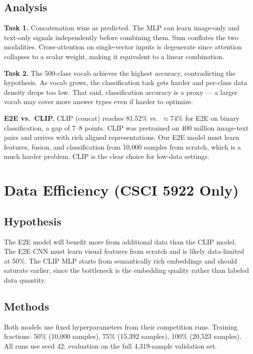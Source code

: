 \documentclass[11pt]{article}
\begin{document}
\subsection{Analysis}

\textbf{Task 1.} Concatenation wins as predicted. The MLP can learn image-only and
text-only signals independently before combining them. Sum conflates the two modalities.
Cross-attention on single-vector inputs is degenerate since attention collapses to a
scalar weight, making it equivalent to a linear combination.

\textbf{Task 2.} The 500-class vocab achieves the highest accuracy, contradicting the
hypothesis. As vocab grows, the classification task gets harder and per-class data
density drops too low. That said, classification accuracy is a proxy — a larger vocab
may cover more answer types even if harder to optimize.

\textbf{E2E vs.\ CLIP.} CLIP (concat) reaches 81.52\% vs.\ $\approx$74\% for E2E on
binary classification, a gap of 7--8 points. CLIP was pretrained on 400 million
image-text pairs and arrives with rich aligned representations. Our E2E model must
learn features, fusion, and classification from 10{,}000 samples from scratch, which is
a much harder problem. CLIP is the clear choice for low-data settings.

\section{Data Efficiency (CSCI 5922 Only)}

\subsection{Hypothesis}

The E2E model will benefit more from additional data than the CLIP model. The E2E CNN
must learn visual features from scratch and is likely data-limited at 50\%. The CLIP
MLP starts from semantically rich embeddings and should saturate earlier, since the
bottleneck is the embedding quality rather than labeled data quantity.

\subsection{Methods}

Both models use fixed hyperparameters from their competition runs. Training fractions:
50\% (10{,}000 samples), 75\% (15{,}392 samples), 100\% (20{,}523 samples). All runs use
seed 42; evaluation on the full 4{,}319-sample validation set.
\end{document}
